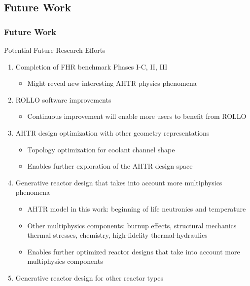 \subsection{Future Work}
\begin{frame}
    \frametitle{Future Work}
    \begin{block}{Potential Future Research Efforts}
    \begin{enumerate}
        \item Completion of FHR benchmark Phases I-C, II, III
        \begin{itemize}
            \item Might reveal new interesting AHTR physics phenomena 
        \end{itemize}
        \item ROLLO software improvements 
            \begin{itemize}
                \item Continuous improvement will enable more users to benefit from ROLLO
            \end{itemize}
        \item AHTR design optimization with other geometry representations 
            \begin{itemize}
                \item Topology optimization for coolant channel shape 
                \item Enables further exploration of the AHTR design space 
            \end{itemize}
        \item Generative reactor design that takes into account more multiphysics phenomena 
            \begin{itemize}
                \item AHTR model in this work: beginning of life neutronics and temperature 
                \item Other multiphysics components: burnup effects, structural mechanics 
                thermal stresses, chemistry, high-fidelity thermal-hydraulics 
                \item Enables further optimized reactor designs that take into account more 
                multiphysics components 
            \end{itemize}
        \item Generative reactor design for other reactor types
    \end{enumerate}
    \end{block}
\end{frame}